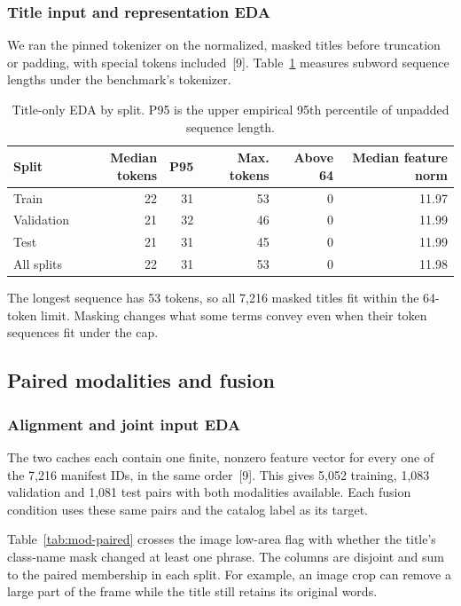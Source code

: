 \documentclass[final]{hcmut-report}
\begin{document}
\subsubsection{Title input and representation EDA}
We ran the pinned tokenizer on the normalized, masked titles before truncation or padding, with special tokens included~[9]. Table~\ref{tab:mod-title} measures subword sequence lengths under the benchmark's tokenizer.

\begin{table}[H]
\centering
\small
\caption{Title-only EDA by split. P95 is the upper empirical 95th percentile of unpadded sequence length.}
\label{tab:mod-title}
\begin{tabular}{@{}lrrrrr@{}}
\toprule
Split & Median tokens & P95 & Max. tokens & Above 64 & Median feature norm\\ \midrule
Train & 22 & 31 & 53 & 0 & 11.97\\
Validation & 21 & 32 & 46 & 0 & 11.99\\
Test & 21 & 31 & 45 & 0 & 11.99\\
All splits & 22 & 31 & 53 & 0 & 11.98\\
\bottomrule
\end{tabular}
\end{table}

The longest sequence has 53 tokens, so all 7,216 masked titles fit within the 64-token limit. Masking changes what some terms convey even when their token sequences fit under the cap.


\subsection{Paired modalities and fusion}
\subsubsection{Alignment and joint input EDA}
The two caches each contain one finite, nonzero feature vector for every one of the 7,216 manifest IDs, in the same order~[9]. This gives 5,052 training, 1,083 validation and 1,081 test pairs with both modalities available. Each fusion condition uses these same pairs and the catalog label as its target.

Table~\ref{tab:mod-paired} crosses the image low-area flag with whether the title's class-name mask changed at least one phrase. The columns are disjoint and sum to the paired membership in each split. For example, an image crop can remove a large part of the frame while the title still retains its original words.
\end{document}
